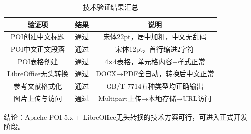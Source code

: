\begin{table}[htbp]
\centering
\caption{技术验证结果汇总}
\label{tab:verify_result}
\begin{tabular}{|c|c|c|}
\hline
\textbf{验证项} & \textbf{结果} & \textbf{说明} \\
\hline
POI创建中文标题 & 通过 & 宋体22pt，居中加粗，中文无乱码 \\
\hline
POI中文正文段落 & 通过 & 宋体12pt，首行缩进2字符 \\
\hline
POI表格创建 & 通过 & 4×4表格，单元格内容+样式正常 \\
\hline
LibreOffice无头转换 & 通过 & DOCX→PDF全自动，转换后中文正常 \\
\hline
参考文献格式化 & 通过 & GB/T 7714五种类型均正确输出 \\
\hline
图片上传与访问 & 通过 & Multipart上传→本地存储→URL访问 \\
\hline
\end{tabular}
\end{table}

结论：Apache POI 5.x + LibreOffice无头转换的技术方案可行，可进入正式开发阶段。
